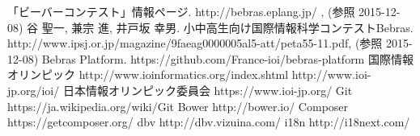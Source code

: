 \documentclass[a4paper]{jarticle}
\begin{document}
\begin{thebibliography}{1}

 「ビーバーコンテスト」情報ページ.  http://bebras.eplang.jp/ , (参照 2015-12-08)
 谷 聖一, 兼宗 進, 井戸坂 幸男. 小中高生向け国際情報科学コンテストBebras.  http://www.ipsj.or.jp/magazine/9faeag0000005al5-att/peta55-11.pdf, (参照 2015-12-08)
 Bebras Platform. https://github.com/France-ioi/bebras-platform
 国際情報オリンピック http://www.ioinformatics.org/index.shtml   http://www.ioi-jp.org/ioi/
日本情報オリンピック委員会 https://www.ioi-jp.org/
 Git  https://ja.wikipedia.org/wiki/Git
Bower  http://bower.io/
Composer  https://getcomposer.org/
dbv  http://dbv.vizuina.com/
i18n  http://i18next.com/



\end{thebibliography}
\end{document}
